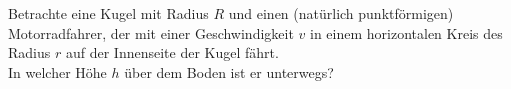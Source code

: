 \begin{Exercise}[label = Motorrad in der Kugel, origin = Maximilian Marienhagen, difficulty = 2, title = Motorrad in der Kugel]Betrachte eine Kugel mit Radius $R$ und einen (natürlich punktförmigen) Motorradfahrer, der mit einer Geschwindigkeit $v$ in einem horizontalen Kreis des Radius $r$ auf der Innenseite der Kugel fährt.\\ In welcher Höhe $h$ über dem Boden ist er unterwegs?
\end{Exercise}